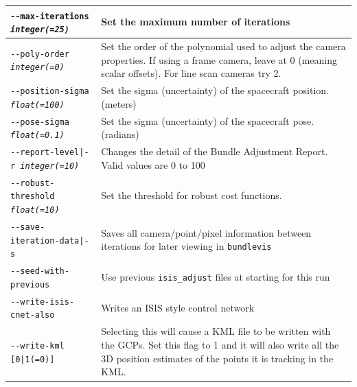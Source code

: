 \begin{longtable}{|l|p{10cm}|}
\texttt{-\/-max-iterations \textit{integer(=25)}} & Set the maximum number of iterations \\ \hline
\texttt{-\/-poly-order \textit{integer(=0)}} & Set the order of the polynomial used to adjust the camera properties. If using a frame camera, leave at 0 (meaning scalar offsets). For line scan cameras try 2. \\ \hline
\texttt{-\/-position-sigma \textit{float(=100)}} & Set the sigma (uncertainty) of the spacecraft position. (meters) \\ \hline
\texttt{-\/-pose-sigma \textit{float(=0.1)}} & Set the sigma (uncertainty) of the spacecraft pose. (radians) \\ \hline
\texttt{-\/-report-level|-r \textit{integer(=10)}} & Changes the detail of the Bundle Adjustment Report. Valid values are 0 to 100 \\ \hline
\texttt{-\/-robust-threshold \textit{float(=10)}} & Set the threshold for robust cost functions. \\ \hline
\texttt{-\/-save-iteration-data|-s} & Saves all camera/point/pixel information between iterations for later viewing in \texttt{bundlevis} \\ \hline
\texttt{-\/-seed-with-previous} & Use previous \texttt{isis\_adjust} files at starting for this run \\ \hline
\texttt{-\/-write-isis-cnet-also} & Writes an ISIS style control network \\ \hline
\texttt{-\/-write-kml [0|1(=0)]} & Selecting this will cause a KML file to be written with the GCPs. Set this flag to 1 and it will also write all the 3D position estimates of the points it is tracking in the KML. \\ \hline
\end{longtable}



